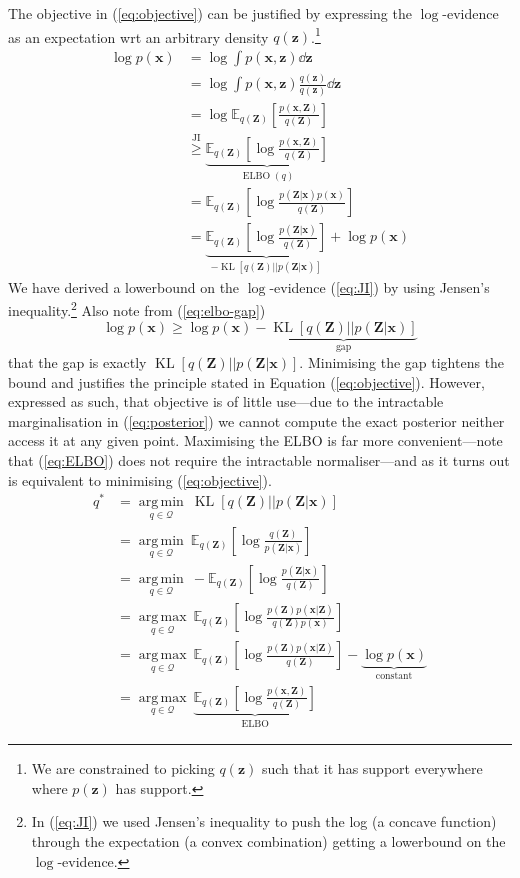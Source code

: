 \documentclass[11pt]{article}
\DeclareMathOperator*{\argmin}{arg\,min}
\DeclareMathOperator*{\argmax}{arg\,max}
\DeclareMathOperator{\KL}{KL}
\DeclareMathOperator{\ELBO}{ELBO}
\newcommand{\E}[2]{\ensuremath{\mathbb E_{#1}\left[ #2 \right]}}
\newcommand{\x}{\ensuremath{\mathbf x}}
\newcommand{\z}{\ensuremath{\mathbf z}}
\newcommand{\Z}{\ensuremath{\mathbf Z}}
\begin{document}
The objective in (\ref{eq:objective}) can be justified by expressing the $\log$-evidence as an expectation wrt an arbitrary density $q(\z)$.\footnote{We are constrained to picking $q(\z)$ such that it has support everywhere where $p(\z)$ has support.}
\begin{subequations}\label{eq:log-evidence}
\begin{align}
\log p(\x) &= \log \int p(\x, \z) \dd \z \\
&= \log \int p(\x, \z)\frac{q(\z)}{q(\z)} \dd \z \\
&= \log \mathbb E_{q(\Z)}\left[\frac{p(\x,\Z)}{q(\Z)}\right] \\
&\overset{\text{JI}}{\ge} \underbrace{\E{q(\Z)}{\log \frac{p(\x,\Z)}{q(\Z)}}}_{\ELBO(q)} \label{eq:JI} \\
&= \E{q(\Z)}{\log \frac{p(\Z|\x)p(\x)}{q(\Z)}} \\
&= \underbrace{\E{q(\Z)}{\log \frac{p(\Z|\x)}{q(\Z)}}}_{-\KL\left[q(\Z) || p(\Z|\x)\right]} + \log p(\x) \label{eq:elbo-gap}
\end{align}
\end{subequations}
We have derived a lowerbound on the $\log$-evidence (\ref{eq:JI}) by using Jensen's inequality.\footnote{In (\ref{eq:JI}) we used Jensen's inequality to push the log (a concave function) through the expectation (a convex combination) getting a lowerbound on the $\log$-evidence.}
Also note from (\ref{eq:elbo-gap})  
\begin{equation}\label{eq:gap}
\log p(\x) \ge \log p(\x) -\underbrace{\KL\left[q(\Z) || p(\Z|\x)\right]}_{\text{gap}}
\end{equation}
that the gap is exactly $\KL[q(\Z)||p(\Z|\x)]$.
Minimising the gap tightens the bound and justifies the principle stated in Equation (\ref{eq:objective}).
However, expressed as such, that objective is of little use---due to the intractable marginalisation in (\ref{eq:posterior}) we cannot compute the exact posterior neither access it at any given point. 
Maximising the ELBO is far more convenient---note that (\ref{eq:ELBO}) does not require the intractable normaliser---and as it turns out is equivalent to minimising (\ref{eq:objective}).
\begin{subequations}
\begin{align}
q^* &= \underset{q \in \mathcal Q}{\argmin} ~ \KL\left[q(\Z) || p(\Z|\x) \right] \\
 &= \underset{q \in \mathcal Q}{\argmin} ~ \E{q(\Z)}{\log \frac{q(\Z)}{p(\Z|\x)} } \\
 &= \underset{q \in \mathcal Q}{\argmin} ~ - \E{q(\Z)}{\log \frac{p(\Z|\x)}{q(\Z)}  } \\
 &= \underset{q \in \mathcal Q}{\argmax} ~ \E{q(\Z)}{\log \frac{p(\Z)p(\x|\Z)}{q(\Z)p(\x)}} \\
 &= \underset{q \in \mathcal Q}{\argmax} ~ \E{q(\Z)}{\log \frac{p(\Z)p(\x|\Z)}{q(\Z)} } - \underbrace{\log p(\x)}_{\text{constant}} \\ 
 &= \underset{q \in \mathcal Q}{\argmax} ~ \underbrace{\E{q(\Z)}{\log \frac{p(\x, \Z)}{q(\Z)} }}_{\text{ELBO}} 
\end{align}
\end{subequations}
\end{document}
